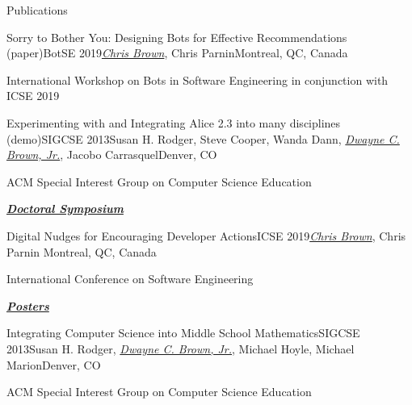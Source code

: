 \documentclass{resume} %
\begin{document}
\begin{rSection}{Publications}
\begin{pSubsection}{Sorry to Bother You: Designing Bots for Effective Recommendations (paper)}{BotSE 2019}{\textit{\underline{Chris Brown}}, Chris Parnin}{Montreal, QC, Canada}
\item International Workshop on
Bots in Software Engineering in conjunction with ICSE 2019
\end{pSubsection}
\begin{pSubsection}{Experimenting with and Integrating Alice 2.3 into many disciplines (demo)}{SIGCSE 2013}{Susan H. Rodger, Steve Cooper, Wanda Dann, \textit{\underline{Dwayne C. Brown, Jr.}}, Jacobo Carrasquel}{Denver, CO}
\item ACM Special Interest Group on Computer Science Education
\end{pSubsection}
\underline{\textbf{\textit{Doctoral Symposium}}}

\begin{pSubsection}{Digital Nudges for Encouraging Developer Actions}{ICSE 2019}{\textit{\underline{Chris Brown}}, Chris Parnin
}{Montreal, QC, Canada}
\item International Conference on Software Engineering
\end{pSubsection}
\underline{\textbf{\textit{Posters}}}

\begin{pSubsection}{Integrating Computer Science into Middle School Mathematics}{SIGCSE 2013}{Susan H. Rodger, \textit{\underline{Dwayne C. Brown, Jr.}}, Michael Hoyle, Michael Marion}{Denver, CO}
\item ACM Special Interest Group on Computer Science Education
\end{pSubsection}
\end{rSection}

\end{document}
